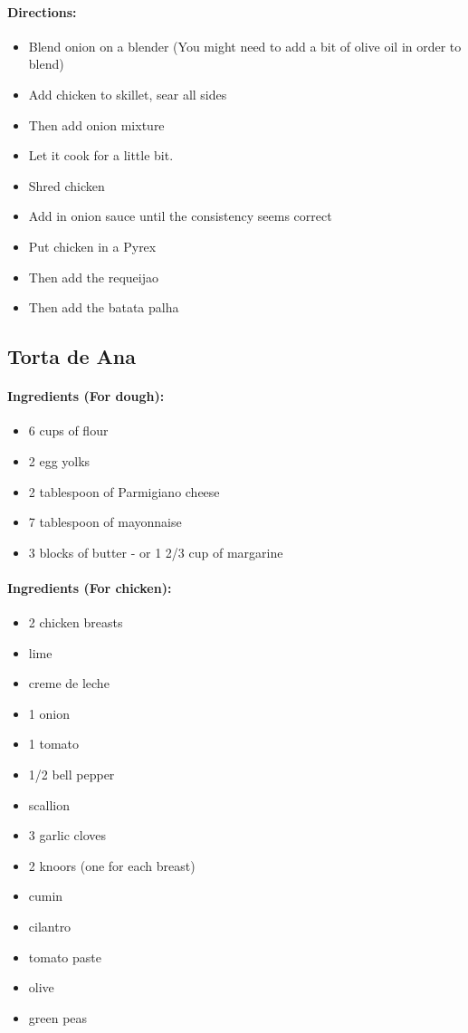 \documentclass{article}
\begin{document}
\paragraph{Directions:}
\begin{itemize}
    \item Blend onion on a blender (You might need to add a bit of olive oil in order to blend)
    \item Add chicken to skillet, sear all sides
    \item Then add onion mixture
    \item Let it cook for a little bit.
    \item Shred chicken
    \item Add in onion sauce until the consistency seems correct
    \item Put chicken in a Pyrex
    \item Then add the requeijao
    \item Then add the batata palha
\end{itemize}

\subsection{Torta de Ana} 

\paragraph{Ingredients (For dough):}
\begin{itemize}
    \item 6 cups of flour
    \item 2 egg yolks
    \item 2 tablespoon of Parmigiano cheese
    \item 7 tablespoon of mayonnaise
    \item 3 blocks of butter - or 1 2/3 cup of margarine
\end{itemize}  

\paragraph{Ingredients (For chicken):}
\begin{itemize}
    \item 2 chicken breasts
    \item lime
    \item creme de leche
    \item 1 onion
    \item 1 tomato
    \item 1/2 bell pepper
    \item scallion
    \item 3 garlic cloves
    \item 2 knoors (one for each breast)
    \item cumin
    \item cilantro
    \item tomato paste
    \item olive
    \item green peas
\end{itemize}  
\end{document}
